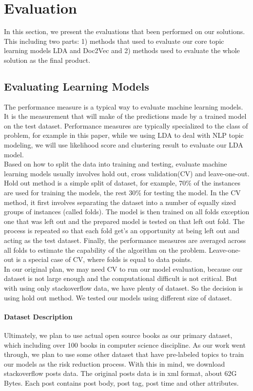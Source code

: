 
\section{Evaluation}
In this section, we present the evaluations that been performed on our solutions. This including two parts: 1) methods that used to evaluate our core topic learning models LDA and Doc2Vec and 2) methods used to evaluate the whole solution as the final product. 
\subsection{Evaluating Learning Models}
The performance measure is a typical way to evaluate machine learning models. It is the measurement that will make of the predictions made by a trained model on the test dataset. Performance measures are typically specialized to the class of problem, for example in this paper, while we using LDA  to deal with NLP topic modeling, we will use likelihood score and clustering result to evaluate our LDA model.\\
Based on how to split the data into training and testing, evaluate machine learning models usually involves hold out, cross validation(CV) and leave-one-out. \\
Hold out method is a simple split of dataset, for example, 70\% of the instances are used for training the models, the rest 30\% for testing the model. In the CV method, it first involves separating the dataset into a number of equally sized groups of instances (called folds). The model is then trained on all folds exception one that was left out and the prepared model is tested on that left out fold. The process is repeated so that each fold get's an opportunity at being left out and acting as the test dataset. Finally, the performance measures are averaged across all folds to estimate the capability of the algorithm on the problem.  Leave-one-out is a special case of CV, where folds is equal to data points.\\
In our original plan, we may need CV to run our model evaluation, because our dataset is not large enough and the computational difficult is not critical. But with using only stackoverflow data, we have plenty of dataset. So the decision is using hold out method. We tested our models using different size of dataset. 
\paragraph{Dataset Description} 
Ultimately, we plan to use actual open source books as our primary dataset, which including over 100 books in computer science discipline. As our work went through, we plan to use some other dataset that have pre-labeled topics to train our models as the risk reduction process. With this in mind, we download stackoverflow posts data. The original posts data is in xml format, about 62G Bytes. Each post contains post body, post tag, post time and other attributes.
